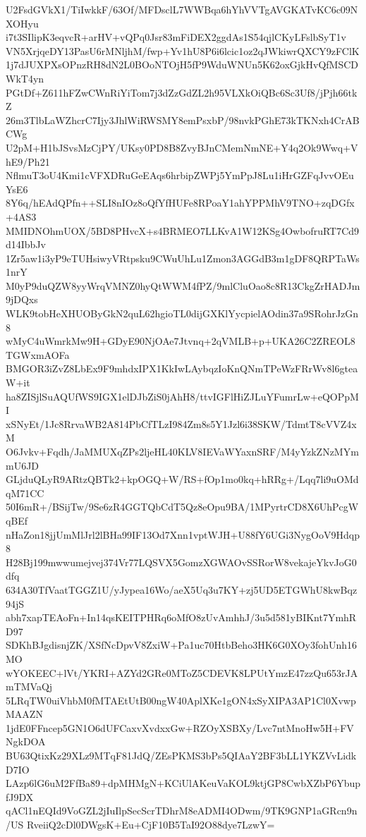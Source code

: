 U2FsdGVkX1/TiIwkkF/63Of/MFDsclL7WWBqa6hYhVVTgAVGKATvKC6c09NXOHyu
i7t3SIlipK3eqvcR+arHV+vQPq0Jsr83mFiDEX2ggdAs1S54qjlCKyLFslbSyT1v
VN5XrjqeDY13PasU6rMNljhM/fwp+Yv1hU8P6i6lcic1oz2qJWkiwrQXCY9zFClK
1j7dJUXPXsOPnzRH8dN2L0BOoNTOjH5fP9WduWNUn5K62oxGjkHvQfMSCDWkT4yn
PGtDf+Z611hFZwCWnRiYiTom7j3dZzGdZL2h95VLXkOiQBc6Sc3Uf8/jPjh66tkZ
26m3TlbLaWZhcrC7Ijy3JhlWiRWSMY8emPsxbP/98nvkPGhE73kTKNxh4CrABCWg
U2pM+H1bJSvsMzCjPY/UKsy0PD8B8ZvyBJnCMemNmNE+Y4q2Ok9Wwq+VhE9/Ph21
NflmuT3oU4Kmi1cVFXDRuGeEAqs6hrbipZWPj5YmPpJ8Lu1iHrGZFqJvvOEuYsE6
8Y6q/hEAdQPfn++SLI8nIOz8oQfYfHUFe8RPoaY1ahYPPMhV9TNO+zqDGfx+4AS3
MMIDNOhmUOX/5BD8PHvcX+s4BRMEO7LLKvA1W12KSg4OwbofruRT7Cd9d14IbbJv
1Zr5aw1i3yP9eTUHsiwyVRtpsku9CWuUhLu1Zmon3AGGdB3m1gDF8QRPTaWs1nrY
M0yP9duQZW8yyWrqVMNZ0hyQtWWM4fPZ/9mlCluOao8c8R13CkgZrHADJm9jDQxs
WLK9tobHeXHUOByGkN2quL62hgioTL0dijGXKlYycpielAOdin37a9SRohrJzGn8
wMyC4uWmrkMw9H+GDyE90NjOAe7Jtvnq+2qVMLB+p+UKA26C2ZREOL8TGWxmAOFa
BMGOR3iZvZ8LbEx9F9mhdxIPX1KkIwLAybqzIoKnQNmTPeWzFRrWv8l6gteaW+it
ha8ZISjlSuAQUfWS9IGX1elDJbZiS0jAhH8/ttvIGFlHiZJLuYFumrLw+eQOPpMI
xSNyEt/1Jc8RrvaWB2A814PbCfTLzI984Zm8s5Y1Jzl6i38SKW/TdmtT8cVVZ4xM
O6Jvkv+Fqdh/JaMMUXqZPs2ljeHL40KLV8IEVaWYaxnSRF/M4yYzkZNzMYmmU6JD
GLjduQLyR9ARtzQBTk2+kpOGQ+W/RS+fOp1mo0kq+hRRg+/Lqq7li9uOMdqM71CC
50I6mR+/BSijTw/9Se6zR4GGTQbCdT5Qz8eOpu9BA/1MPyrtrCD8X6UhPcgWqBEf
nHaZon18jjUmMlJrl2lBHa99IF13Od7Xnn1vptWJH+U88fY6UGi3NygOoV9Hdqp8
H28Bj199mwwumejvej374Vr77LQSVX5GomzXGWAOvSSRorW8vekajeYkvJoG0dfq
634A30TfVaatTGGZ1U/yJypea16Wo/aeX5Uq3u7KY+zj5UD5ETGWhU8kwBqz94jS
abh7xapTEAoFn+In14qsKEITPHRq6oMfO8zUvAmhhJ/3u5d581yBIKnt7YmhRD97
SDKhBJgdisnjZK/XSfNcDpvV8ZxiW+Pa1uc70HtbBeho3HK6G0XOy3fohUnh16MO
wYOKEEC+lVt/YKRI+AZYd2GRe0MToZ5CDEVK8LPUtYmzE47zzQu653rJAmTMVaQj
5LRqTW0uiVhbM0fMTAEtUtB00ngW40AplXKe1gON4xSyXIPA3AP1Cl0XvwpMAAZN
1jdE0FFncep5GN1O6dUFCaxvXvdxxGw+RZOyXSBXy/Lvc7ntMnoHw5H+FVNgkDOA
BU63QtixKz29XLz9MTqF81JdQ/ZEsPKMS3bPs5QIAaY2BF3bLL1YKZVvLidkD7IO
LAzp6lG6uM2FfBa89+dpMHMgN+KCiUlAKeuVaKOL9ktjGP8CwbXZbP6YbupfJ9DX
qACl1nEQId9VoGZL2jIuIlpSecScrTDhrM8eADMI4ODwm/9TK9GNP1aGRcn9n/US
RveiiQ2cDl0DWgsK+Eu+CjF10B5TaI92O88dye7LzwY=
